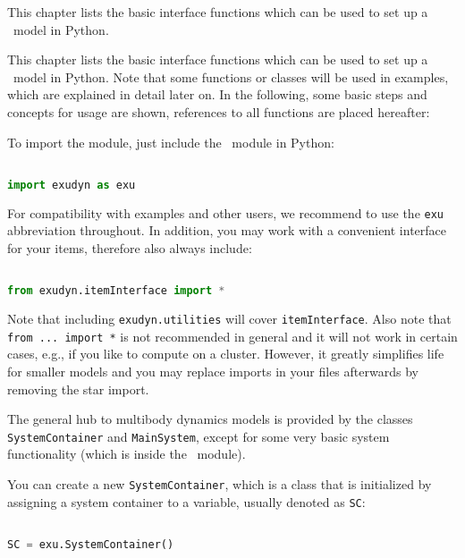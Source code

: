 
\label{sec:PCpp:command:interface}

This chapter lists the basic interface functions which can be used to set up a \codeName\ model in Python.

\label{sec:generalPythonInterface}
This chapter lists the basic interface functions which can be used to set up 
a \codeName\ model in Python. Note that some functions or classes will be used in examples, which are explained in detail later on.
In the following, some basic steps and concepts for usage are shown, references to all functions are placed hereafter:

To import the module, just include the \codeName\ module in Python:
\pythonstyle
\begin{lstlisting}[language=Python, firstnumber=1]

import exudyn as exu
\end{lstlisting}


For compatibility with examples and other users, we recommend to use the \texttt{exu} abbreviation throughout. In addition, you may work with a convenient interface for your items, therefore also always include:
\pythonstyle
\begin{lstlisting}[language=Python, firstnumber=1]

from exudyn.itemInterface import *
\end{lstlisting}


Note that including \texttt{exudyn.utilities} will cover \texttt{itemInterface}. Also note that \texttt{from ... import *} is not recommended in general and it will not work in certain cases, e.g., if you like to compute on a cluster. However, it greatly simplifies life for smaller models and you may replace imports in your files afterwards by removing the star import.

The general hub to multibody dynamics models is provided by the classes \texttt{SystemContainer} and \texttt{MainSystem}, except for some very basic system functionality (which is inside the \codeName\ module). 

You can create a new \texttt{SystemContainer}, which is a class that is initialized by assigning a system container to a variable, usually denoted as \texttt{SC}:
\pythonstyle
\begin{lstlisting}[language=Python, firstnumber=1]

SC = exu.SystemContainer()
\end{lstlisting}


